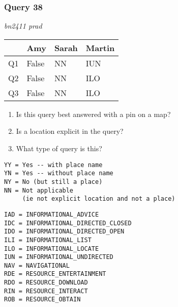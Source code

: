\begin{frame}[fragile]
\frametitle{Query 38}
\vspace{1em}

\emph{bn2411 prad}

\vfill

\begin{table}
  \centering
  \begin{tabular}{ l l l l }
    & \textbf{Amy} & \textbf{Sarah} & \textbf{Martin}\\
    \toprule
    Q1 & False & NN & IUN\\
Q2 & False & NN & ILO\\
Q3 & False & NN & ILO\\
    \bottomrule
  \end{tabular}
\end{table}

\vfill

\tiny{

\begin{enumerate}
\item Is this query best answered with a pin on a map?
\item Is a location explicit in the query?
\item What type of query is this?
\end{enumerate}

\vfill

\begin{multicols}{2}
\begin{verbatim}
YY = Yes -- with place name
YN = Yes -- without place name
NY = No (but still a place)
NN = Not applicable 
     (ie not explicit location and not a place)
\end{verbatim}

\columnbreak
\begin{verbatim}
IAD = INFORMATIONAL_ADVICE
IDC = INFORMATIONAL_DIRECTED_CLOSED
IDO = INFORMATIONAL_DIRECTED_OPEN
ILI = INFORMATIONAL_LIST
ILO = INFORMATIONAL_LOCATE
IUN = INFORMATIONAL_UNDIRECTED
NAV = NAVIGATIONAL
RDE = RESOURCE_ENTERTAINMENT
RDO = RESOURCE_DOWNLOAD
RIN = RESOURCE_INTERACT
ROB = RESOURCE_OBTAIN
\end{verbatim}
\end{multicols}
}

\end{frame}


